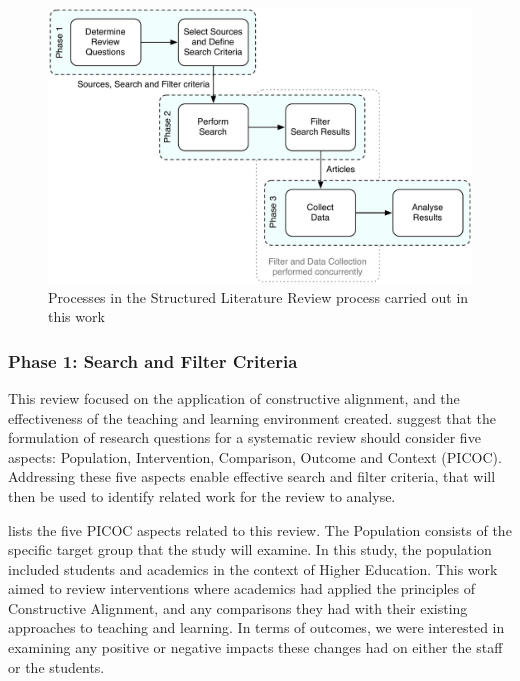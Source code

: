 \begin{figure}[tbph]
	\centering
	\includegraphics[width=\textwidth]{SystematicReview}
	\caption{Processes in the Structured Literature Review process carried out in this work}
	\label{fig:struct_review_proc}
\end{figure}



\subsubsection{Phase 1: Search and Filter Criteria} %
\label{sub:review_questions}

This review focused on the application of constructive alignment, and the effectiveness of the teaching and learning environment created. \citet{Petticrew:2008} suggest that the formulation of research questions for a systematic review should consider five aspects: Population, Intervention, Comparison, Outcome and Context (PICOC). Addressing these five aspects enable effective search and filter criteria, that will then be used to identify related work for the review to analyse.

 lists the five PICOC aspects related to this review. The Population consists of the specific target group that the study will examine. In this study, the population included students and academics in the context of Higher Education. This work aimed to review interventions where academics had applied the principles of Constructive Alignment, and any comparisons they had with their existing approaches to teaching and learning. In terms of outcomes, we were interested in examining any positive or negative impacts these changes had on either the staff or the students.

